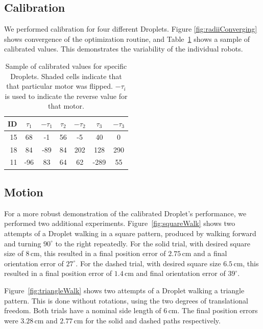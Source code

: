 \documentclass[letterpaper, 10pt, conference]{ieeeconf}
\begin{document}
\subsection{Calibration}
We performed calibration for four different Droplets. Figure \ref{fig:radiiConverging} shows convergence of the optimization routine, and Table~\ref{DropletValueTable} shows a sample of calibrated values. This demonstrates the variability of the individual robots.

\begin{table}[htb!]
\centering
\begin{tabular}{r|c|c|c|c|c|c}
 ID & $\tau_1$ & $-\tau_1$ & $\tau_2$ & $-\tau_2$ & $\tau_3$ & $-\tau_3$ \\
\hline
15 & 68 & -1 & 56 & -5 & \cellcolor{gray!15} 40 & \cellcolor{gray!15} 0\\ 
18 & 84 & -89 & 84 & 202 & \cellcolor{gray!15} 128 & \cellcolor{gray!15} 290\\
11 & -96 & 83 & 64 & 62 & -289 & 55
\end{tabular}
\caption{Sample of calibrated values for specific Droplets. Shaded cells indicate that that particular motor was flipped. $-\tau_i$ is used to indicate the reverse value for that motor.}
\label{DropletValueTable}
\vspace{-1em}
\end{table}

\subsection{Motion}
For a more robust demonstration of the calibrated Droplet's performance, we performed two additional experiments. Figure~\ref{fig:squareWalk} shows two attempts of a Droplet walking in a square pattern, produced by walking forward and turning $90^\circ$ to the right repeatedly. For the solid trial, with desired square size of $8\,\mathrm{cm}$, this resulted in a final position error of $2.75\,\mathrm{cm}$ and a final orientation error of $27^\circ$. For the dashed trial, with desired square size $6.5\,\mathrm{cm}$, this resulted in a final position error of $1.4\,\mathrm{cm}$ and final orientation error of $39^\circ$.

Figure~\ref{fig:triangleWalk} shows two attempts of a Droplet walking a triangle pattern. This is done without rotations, using the two degrees of translational freedom. Both trials have a nominal side length of $6\,\mathrm{cm}$. The final position errors were $3.28\,\mathrm{cm}$ and $2.77\,\mathrm{cm}$ for the solid and dashed paths respectively.
\end{document}
